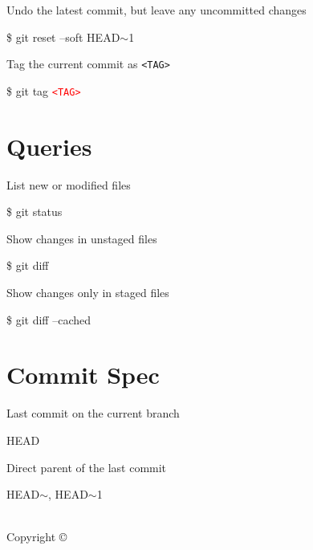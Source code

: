 \documentclass[10pt,a4paper]{article}
\newenvironment{cheatentry}{%
    \noindent%
    \begin{minipage}{\columnwidth}%
    \small%
    \noindent%
}{%
    \end{minipage}%
}
\newcommand{\entrysep}{\vspace{1em}}
\newcommand{\cheatcmd}[1]{%
    \noindent\begin{cmdbox}{\large\ttfamily\fontseries{b}\selectfont #1}\end{cmdbox}
}
\newcommand{\cheatmetavar}[1]{%
    \textcolor{red}{\texttt{\textless{}#1\textgreater{}}}%
}
\newcommand{\cheatmetavarref}[1]{%
    {\texttt{\textless{}#1\textgreater{}}}%
}
\newcommand{\HEADP}[1][]{HEAD$\sim$#1}
\begin{document}
\begin{multicols}{4}
\begin{cheatentry}%
Undo the latest commit, but leave any uncommitted changes
\cheatcmd{\$ git reset --soft \HEADP[1]}
\end{cheatentry}

\entrysep{}%

\begin{cheatentry}%
Tag the current commit as \cheatmetavarref{TAG}
\cheatcmd{\$ git tag \cheatmetavar{TAG}}
\end{cheatentry}

\section{Queries}

\begin{cheatentry}%
List new or modified files
\cheatcmd{\$ git status}
\end{cheatentry}

\entrysep{}%

\begin{cheatentry}%
Show changes in unstaged files
\cheatcmd{\$ git diff}
\end{cheatentry}

\entrysep{}%

\begin{cheatentry}%
Show changes only in staged files
\cheatcmd{\$ git diff --cached}
\end{cheatentry}

\section{Commit Spec}

\begin{cheatentry}%
Last commit on the current branch
\cheatcmd{HEAD}
\end{cheatentry}

\entrysep{}%

\begin{cheatentry}%
Direct parent of the last commit
\cheatcmd{\HEADP, \HEADP[1]}
\end{cheatentry}

\vfill

\makeatletter
\begin{flushright}\
\@title\\
Copyright \copyright{} \@author
\end{flushright}
\makeatother

\end{multicols}
\end{document}
